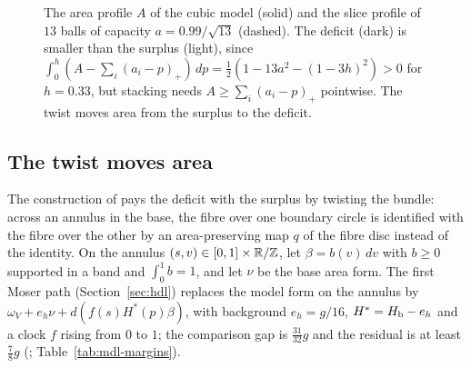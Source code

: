 \begin{figure}[ht]
\centering
{}
\caption{The area profile $A$ of the cubic model (solid) and the slice profile of $13$ balls of capacity
$a=0.99/\sqrt{13}$ (dashed). The deficit (dark) is smaller than the surplus (light), since
$\int_0^h(A-\sum_i(a_i-p)_+)\,dp=\frac12(1-13a^2-(1-3h)^2)>0$ for $h=0.33$, but stacking needs $A\ge\sum_i(a_i-p)_+$
pointwise. The twist moves area from the surplus to the deficit.}
\label{fig:intro-profile}
\end{figure}

\subsection{The twist moves area}\label{sec:mech-twist}

The construction of \cite{OpenAI2026} pays the deficit with the surplus by twisting the bundle: across an annulus in
the base, the fibre over one boundary circle is identified with the fibre over the other by an area-preserving map $q$
of the fibre disc instead of the identity. On the annulus $(s,v)\in[0,1]\times\mathbb{R}/\mathbb{Z}$, let $\beta=b(v)\,dv$ with $b\ge0$ supported in a band and
$\int_0^1b=1$, and let $\nu$ be the base area form. The first Moser path (Section~\ref{sec:hdl}) replaces the model form
on the annulus by $\omega_V+e_h\nu+d(f(s)H^*(p)\beta)$, with background $e_h=g/16$, $H^*=H_{\mathrm b}-e_h$ and a clock $f$
rising from $0$ to $1$; the comparison gap is $\frac{31}{32}g$ and the residual is at least $\frac78g$
(; Table~\ref{tab:mdl-margins}).

